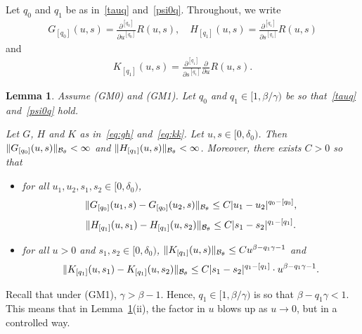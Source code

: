 \documentclass[12pt]{article}
\numberwithin{equation}{section}
\newtheorem{lemma}[thm]{Lemma}
\begin{document}
 Let $q_0$ and $q_1$ be as in~\eqref{tauq} and~\eqref{psi0q}.
Throughout, we write
\begin{align}\label{eq:gh}
 G_{[q_0]}(u,s)=\frac{\partial^{[q_0]}}{\partial u^{[q_0]}}R(u,s),\quad H_{[q_1]}(u,s)=\frac{\partial^{[q_1]}}{\partial s^{[q_1]}}R(u,s)
 \end{align}
and 
\begin{align}\label{eq:kk}
  K_{[q_1]}(u,s)=\frac{\partial^{[q_1]}}{\partial s^{[q_1]}}\frac{\partial}{\partial u} R(u,s).
\end{align}

\begin{lemma}\label{lemma:sm}
 Assume (GM0) and (GM1). Let $q_0$ and $q_1\in [1,\beta/\gamma)$ be so that~\eqref{tauq} and~\eqref{psi0q} hold.
 
 Let $G$, $H$ and $K$ as in~\eqref{eq:gh} and~\eqref{eq:kk}. Let $u, s \in [0,\delta_0)$. 
 Then $\|G_{[q_0]}(u,s)\|_{\mathcal{B}_\theta}<\infty$ and $\|H_{[q_1]}(u,s)\|_{\mathcal{B}_\theta}<\infty$. Moreover, there exists $C>0$ so that 
 \begin{itemize}\item[(i)]for all $u_1,u_2,s_1,s_2\in [0, \delta_0)$,
 \[
  \|G_{[q_0]}(u_1,s)-G_{[q_0]}(u_2,s)\|_{\mathcal{B}_\theta}\le C|u_1-u_2|^{q_0-[q_0]},
  \]
    \[\|H_{[q_1]}(u,s_1)-H_{[q_1]}(u,s_2)\|_{\mathcal{B}_\theta}\le C|s_1-s_2|^{q_1-[q_1]}.
 \]
  \item[(ii)] for all $u>0$ and $s_1,s_2 \in [0,\delta_0)$,
  \(
  \|K_{[q_1]}(u,s)\|_{\mathcal{B}_\theta}\le C u^{\beta-q_1\gamma-1}
   \)
   and
  \[
  \|K_{[q_1]}(u,s_1)-K_{[q_1]}(u,s_2)\|_{\mathcal{B}_\theta}\le C|s_1-s_2|^{q_1-[q_1]}\cdot u^{\beta-q_1\gamma-1}.
 \]
 \end{itemize}
\end{lemma}
\begin{rmk}\label{rmk:q1}
 Recall that under (GM1), $\gamma>\beta-1$. Hence, $q_1\in [1,\beta/\gamma)$ is so that
  $\beta-q_1\gamma<1$. This means that
 in Lemma~\ref{lemma:sm}(ii), the factor in $u$ blows up as $u\to 0$, but in a controlled way.
 \end{rmk}
\end{document}
